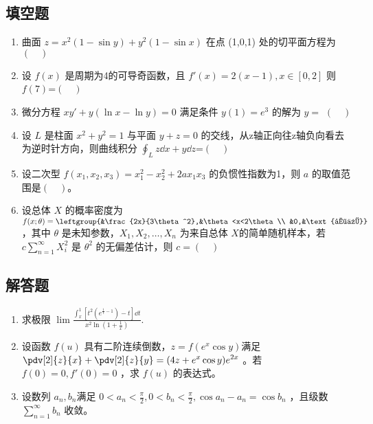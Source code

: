 \subsection{填空题}
\begin{enumerate}
\item 曲面 $z=x^2(1-\sin y)+y^2(1-\sin x)$  在点 (1,0,1) 处的切平面方程为$(\quad)$
\item 设 $f(x)$ 是周期为4的可导奇函数，且 $f'(x)=2(x-1),x \in [0,2]$  则 $f(7)$=$(\quad)$
\item 微分方程 $xy'+y(\ln x-\ln y)=0$ 满足条件 $y(1)=e^3$ 的解为 $y=$ $(\quad)$
\item 设 $L$ 是柱面 $x^2+y^2=1$ 与平面 $y+z=0$ 的交线，从z轴正向往z轴负向看去为逆时针方向，则曲线积分 $\displaystyle \oint_L z\dd{x}+y\dd{z}$=$(\quad)$
\item 设二次型 $f(x_1,x_2,x_3)=x_1^2-x_2^2+2ax_1x_3$  的负惯性指数为1，则 $a$ 的取值范围是$(\quad)$。
\item 设总体 $X$ 的概率密度为$f(x;\theta)=\leftgroup{&\frac{2x}{3\theta^2},&\theta<x<2\theta \\ &0,&\text{其他}} $ ，其中 $\theta$  是未知参数，$X_1,X_2,\dots,X_n$  为来自总体 $X$的简单随机样本，若  $\displaystyle c\sum_{n=1}^\infty X_i^2$ 是 $\theta^2$ 的无偏差估计，则 $c=(\quad)$
\end{enumerate}
\subsection{解答题}
\begin{enumerate}
\item 求极限 $\displaystyle \lim \frac{\int_{x}^{1} [t^2(e^{\frac{1}{t}-1})-t]\dd{t}}{x^2\ln(1+\frac{1}{x})}$.
\item 设函数 $f(u)$ 具有二阶连续倒数，$z=f(e^x\cos y)$满足 $\displaystyle \pdv[2]{z}{x}+\pdv[2]{z}{y}=(4z+e^x\cos y)e^{2x}$  。若 $f(0)=0,f'(0)=0$ ，求 $f(u)$ 的表达式。
\item 设数列 ${a_n},{b_n}$满足 $\displaystyle 0<a_n<\frac{\pi}{2},0<b_n<\frac{\pi}{2},\cos a_n-a_n=\cos b_n$ ，且级数 $\displaystyle \sum_{n=1}^\infty b_n$  收敛。\\
\end{enumerate}
